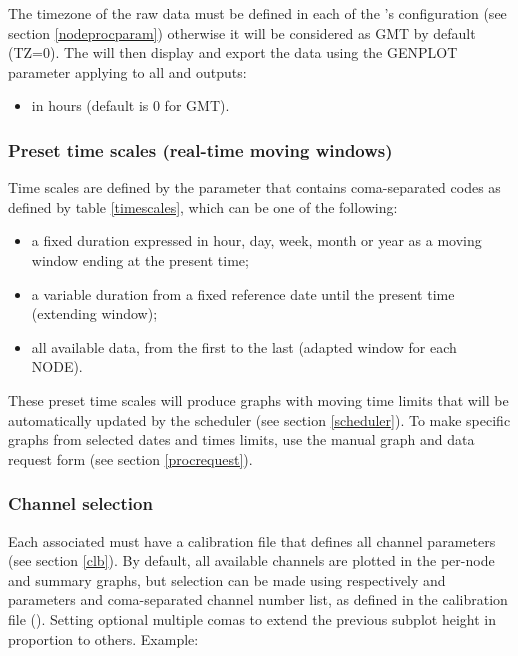 The timezone of the raw data must be defined in each of the 's configuration (see section \ref{nodeprocparam}) otherwise it will be considered as GMT by default (TZ=0). The  will then display and export the data using the GENPLOT parameter applying to all  and outputs:
\begin{itemize}
\item {} in hours (default is 0 for GMT).
\end{itemize}


\subsubsection{Preset time scales (real-time moving windows)}

Time scales are defined by the  parameter that contains coma-separated codes as defined by table \ref{timescales}, which can be one of the following:
\begin{itemize}
\item a fixed duration expressed in hour, day, week, month or year as a moving window ending at the present time;
\item a variable duration from a fixed reference date until the present time (extending window);
\item all available data, from the first to the last (adapted window for each NODE).
\end{itemize}

These preset time scales will produce graphs with moving time limits that will be automatically updated by the scheduler (see section \ref{scheduler}). To make specific graphs from selected dates and times limits, use the manual  graph and data request form (see section \ref{procrequest}).

\subsubsection{Channel selection}

Each associated  must have a calibration file that defines all channel parameters (see section \ref{clb}).
By default, all available channels are plotted in the per-node and summary graphs, but selection can be made using respectively  and  parameters and coma-separated channel number list, as defined in the calibration file (). Setting optional multiple comas to extend the previous subplot height in proportion to others. Example:

